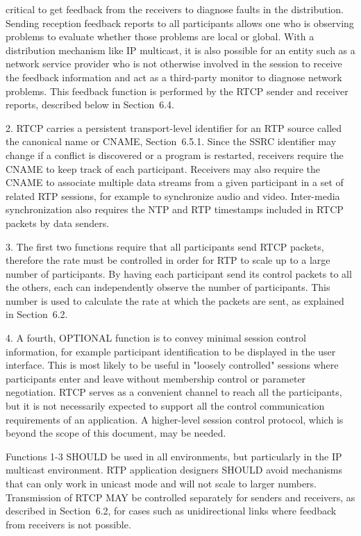 \documentclass{article}
\begin{document}
critical to get feedback from the receivers to diagnose faults in the distribution.  Sending reception feedback reports to all participants allows one who is observing problems to evaluate whether those problems are local or global.  With a distribution mechanism like IP multicast, it is also possible for an entity such as a network service provider who is not otherwise involved in the session to receive the feedback information and act as a third-party monitor to diagnose network problems.  This feedback function is performed by the RTCP sender and receiver reports, described below in Section~6.4.

2. RTCP carries a persistent transport-level identifier for an RTP source called the canonical name or CNAME, Section~6.5.1.  Since the SSRC identifier may change if a conflict is discovered or a program is restarted, receivers require the CNAME to keep track of each participant.  Receivers may also require the CNAME to associate multiple data streams from a given participant in a set of related RTP sessions, for example to synchronize audio and video.  Inter-media synchronization also requires the NTP and RTP timestamps included in RTCP packets by data senders.

3. The first two functions require that all participants send RTCP packets, therefore the rate must be controlled in order for RTP to scale up to a large number of participants.  By having each participant send its control packets to all the others, each can independently observe the number of participants.  This number is used to calculate the rate at which the packets are sent, as explained in Section~6.2.

4. A fourth, OPTIONAL function is to convey minimal session control information, for example participant identification to be displayed in the user interface.  This is most likely to be useful in "loosely controlled" sessions where participants enter and leave without membership control or parameter negotiation.  RTCP serves as a convenient channel to reach all the participants, but it is not necessarily expected to support all the control communication requirements of an application.  A higher-level session control protocol, which is beyond the scope of this document, may be needed.

Functions 1-3 SHOULD be used in all environments, but particularly in the IP multicast environment.  RTP application designers SHOULD avoid mechanisms that can only work in unicast mode and will not scale to larger numbers.  Transmission of RTCP MAY be controlled separately for senders and receivers, as described in Section~6.2, for cases such as unidirectional links where feedback from receivers is not possible.
\end{document}
